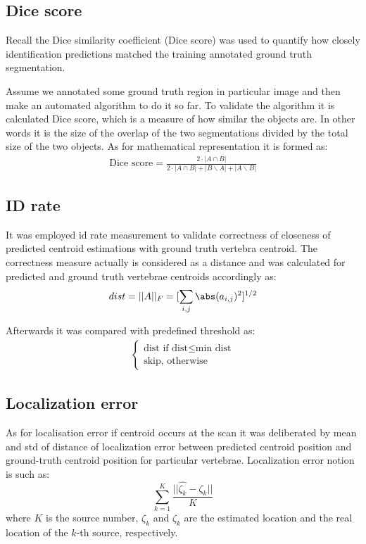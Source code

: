 \subsection{Dice score}
Recall the \cite{Thada2013} Dice similarity coefficient (Dice score) was used to quantify how closely identification predictions matched the training annotated ground truth segmentation. 

Assume we annotated some ground truth region in particular image and then make an automated algorithm to do it so far. To validate the algorithm it is calculated Dice score, which is a measure of how similar the objects are. In other words it is the size of the overlap of the two segmentations divided by the total size of the two objects. As for mathematical representation it is formed as:
\begin{align*}
  \text{Dice score} = \frac{2\cdot|A\cap B|}{2\cdot|A\cap B| + |B\backslash A| + |A\backslash B|}
\end{align*}

\subsection{ID rate}
It was employed id rate measurement to validate correctness of closeness of predicted centroid estimations with ground truth vertebra centroid. The correctness measure actually is considered as a distance and was calculated for predicted and ground truth vertebrae centroids accordingly as:
\[ dist = ||A||_F = [\sum_{i,j} \abs(a_{i,j})^2]^{1/2} \]

Afterwards it was compared with predefined threshold as:
\begin{align*}
\begin{cases}
\text{dist} \mbox{ if } \text{dist} \leq \text{min dist} \\ 
\text{skip}, \mbox{ otherwise} \end{cases}
\end{align*}

\subsection{Localization error}
As for localisation error if centroid occurs at the scan it was deliberated by mean and std of distance of localization error between predicted centroid position and ground-truth centroid position for particular vertebrae. Localization error notion is such as:
\[ \sum_{k=1}^K \frac{||\hat{\zeta_k} - \zeta_k || }{K} \]
where $K$ is the source number, $\hat{\zeta_k}$ and $\zeta_k$ are the estimated location and the real location of the $k$-th source, respectively.

